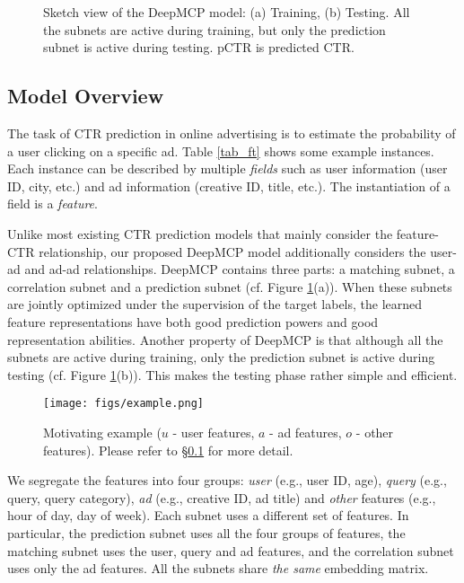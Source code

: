 \documentclass{article}
\begin{document}
\begin{figure}[!t]
\centering
{} \vskip -5pt
\vskip -4pt
\caption{Sketch view of the DeepMCP model: (a) Training, (b) Testing. All the subnets are active during training, but only the prediction subnet is active during testing. pCTR is predicted CTR.}
\vskip -6pt
\label{model_sketch}
\end{figure}

\subsection{Model Overview} \label{sec_overview}
The task of CTR prediction in online advertising is to estimate the probability of a user clicking on a specific ad.
Table \ref{tab_ft} shows some example instances. Each instance can be described by multiple \emph{fields} such as user information (user ID, city, etc.) and ad information (creative ID, title, etc.). The instantiation of a field is a \emph{feature}.

Unlike most existing CTR prediction models that mainly consider the feature-CTR relationship, our proposed DeepMCP model additionally considers the user-ad and ad-ad relationships.
DeepMCP contains three parts: a matching subnet, a correlation subnet and a prediction subnet (cf. Figure \ref{model_sketch}(a)).
When these subnets are jointly optimized under the supervision of the target labels, the learned feature representations have both good prediction powers and good representation abilities.
Another property of DeepMCP is that although all the subnets are active during training, only the prediction subnet is active during testing (cf. Figure \ref{model_sketch}(b)). This makes the testing phase rather simple and efficient.

\begin{figure}[!t]
\centering
\texttt{[image: figs/example.png]}
\vskip -4pt
\caption{Motivating example ($u$ - user features, $a$ - ad features, $o$ - other features). Please refer to \S\ref{sec_overview} for more detail.}
\vskip -6pt
\label{example}
\end{figure}

We segregate the features into four groups: \emph{user} (e.g., user ID, age), \emph{query} (e.g., query, query category), \emph{ad} (e.g., creative ID, ad title) and \emph{other} features (e.g., hour of day, day of week). Each subnet uses a different set of features. In particular, the prediction subnet uses all the four groups of features, the matching subnet uses the user, query and ad features, and the correlation subnet uses only the ad features.
All the subnets share \emph{the same} embedding matrix.
\end{document}

